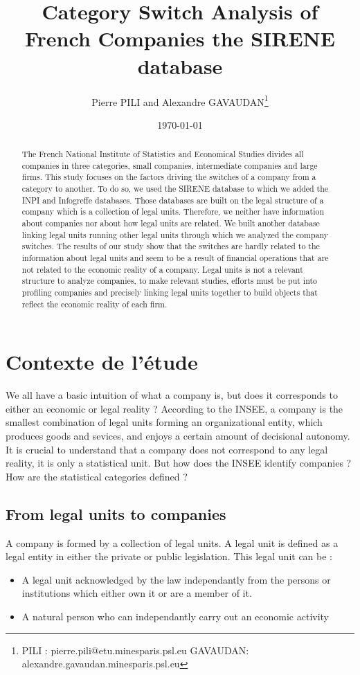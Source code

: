 \documentclass[AEJ]{AEA}
\begin{document}
\title{Category Switch Analysis of French Companies  the SIRENE database}
\author{Pierre PILI and Alexandre GAVAUDAN\thanks{%
PILI : pierre.pili@etu.minesparis.psl.eu GAVAUDAN: alexandre.gavaudan.minesparis.psl.eu}}
\date{\today}
\JEL{}
\Keywords{}

\begin{abstract}
The French National Institute of Statistics and Economical Studies divides all companies in three categories,
small companies, intermediate companies and large firms.
This study focuses on the factors driving the switches of a company from a category to another.
To do so, we used the SIRENE database to which we added the INPI and Infogreffe databases.
Those databases are built on the legal structure of a company which is a collection of legal units.
Therefore, we neither have information about companies nor about how legal units are related.
We built another database linking legal units running other legal units through which we analyzed the company switches.
The results of our study show that the switches are hardly related to the information about legal units and seem to be a result
of financial operations that are not related to the economic reality of a company.
Legal units is not a relevant structure to analyze companies, to make relevant studies, efforts must be put into
profiling companies and precisely linking legal units together to build objects that reflect the economic reality of each firm. 
\end{abstract}
\maketitle
\section{Contexte de l'étude}
We all have a basic intuition of what a company is, but does it corresponds to
either an economic or legal reality ? According to the INSEE, a company is
the smallest combination of legal units forming an organizational entity, 
which produces goods and sevices, and enjoys a certain amount of decisional autonomy.
It is crucial to understand that a company does not correspond to any legal reality, it is only a statistical unit.
But how does the INSEE identify companies ?
How are the statistical categories defined ?
\subsection{From legal units to companies}
A company is formed by a collection of legal units. A legal unit is defined as a
legal entity in either the private or public legislation. This legal unit can be :
\begin{itemize}
    \item A legal unit acknowledged by the law independantly from the persons or institutions
which either own it or are a member of it.
    \item A natural person who can independantly carry out an economic activity 
\end{itemize}
\end{document}
